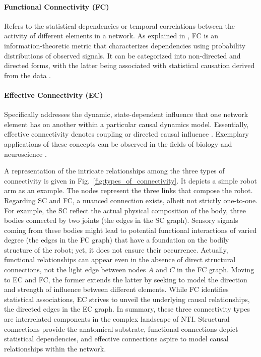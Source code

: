 \paragraph*{Functional Connectivity (FC)} Refers to the statistical dependencies or temporal correlations between the activity of different elements in a network. As explained in \cite{Friston2011Functionaleffectiveconnectivity}, FC is an information-theoretic metric that characterizes dependencies using probability distributions of observed signals. It can be categorized into non-directed and directed forms, with the latter being associated with statistical causation derived from the data \cite{Bastos2016tutorialreviewfunctional}. %

\paragraph*{Effective Connectivity (EC)} Specifically addresses the dynamic, state-dependent influence that one network element has on another within a particular causal dynamics model. Essentially, effective connectivity denotes coupling or directed causal influence \cite{Park2013Structuralfunctionalbrain}. Exemplary applications of these concepts can be observed in the fields of biology \cite{Zhang2017Networkbasedmachine} and neuroscience \cite{Karwowski2019Applicationgraphtheory,Sporns2018Graphtheorymethods}.

A representation of the intricate relationships among the three types of connectivity is given in Fig.~\ref{fig:types_of_connectivity}. It depicts a simple robot arm as an example. The nodes represent the three links that compose the robot. Regarding SC and FC, a nuanced connection exists, albeit not strictly one-to-one. For example, the SC reflect the actual physical composition of the body, three bodies connected by two joints (the edges in the SC graph). Sensory signals coming from these bodies might lead to potential functional interactions of varied degree (the edges in the FC graph) that have a foundation on the bodily structure of the robot; yet, it does not ensure their occurrence. Actually, functional relationships can appear even in the absence of direct structural connections, not the light edge between nodes $A$ and $C$ in the FC graph. Moving to EC and FC, the former extends the latter by seeking to model the direction and strength of influence between different elements. While FC identifies statistical associations, EC strives to unveil the underlying causal relationships, the directed edges in the EC graph. In summary, these three connectivity types are interrelated components in the complex landscape of NTI. Structural connections provide the anatomical substrate, functional connections depict statistical dependencies, and effective connections aspire to model causal relationships within the network.



